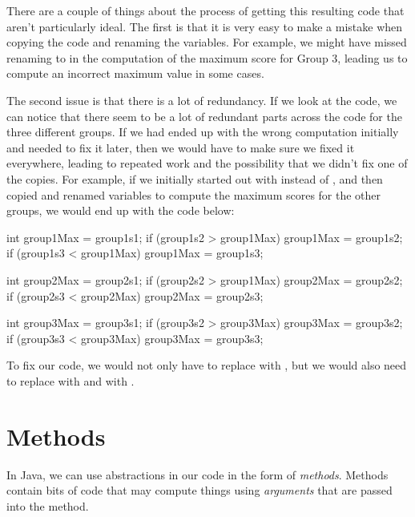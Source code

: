 \noindent There are a couple of things about the process of getting this resulting code
that aren't particularly ideal.
The first is that it is very easy to make a mistake when copying the code and renaming
the variables. For example, we might have missed renaming  to 
in the computation of the maximum score for Group 3, leading us to compute an incorrect maximum
value in some cases.

The second issue is that there is a lot of redundancy.
If we look at the code, we can notice that there seem to be a lot of redundant parts
across the code for the three different groups.
If we had ended up with the wrong computation initially and needed to fix it
later, then we would have to make sure we fixed it everywhere, leading to repeated work and the
possibility that we didn't fix one of the copies. For example, if we initially started out with
 instead of , and then copied and renamed variables
to compute the maximum scores for the other groups, we would end up with the code below:

\begin{code}
int group1Max = group1s1;
if (group1s2 > group1Max) {
  group1Max = group1s2;
}
if (group1s3 < group1Max) {
  group1Max = group1s3;
}

int group2Max = group2s1;
if (group2s2 > group1Max) {
  group2Max = group2s2;
}
if (group2s3 < group2Max) {
  group2Max = group2s3;
}

int group3Max = group3s1;
if (group3s2 > group3Max) {
  group3Max = group3s2;
}
if (group3s3 < group3Max) {
  group3Max = group3s3;
}
\end{code}

To fix our code, we would not only have to replace  with
, but we would also need to replace  with
 and  with .

\section{Methods}\label{sec:methods}
In Java, we can use abstractions in our code in the form of \emph{methods}.
Methods contain bits of code that may compute things using \emph{arguments}
that are passed into the method.

